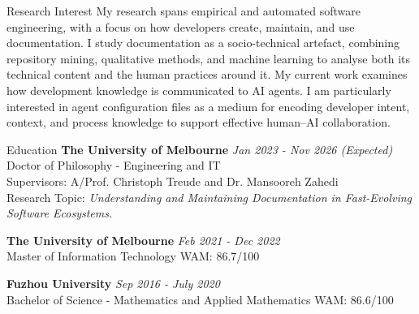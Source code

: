 \documentclass{resume}
\begin{document}

\begin{rSection}{Research Interest}
My research spans empirical and automated software engineering, with a focus on how developers create, maintain, and use documentation. I study documentation as a socio-technical artefact, combining repository mining, qualitative methods, and machine learning to analyse both its technical content and the human practices around it. My current work examines how development knowledge is communicated to AI agents. I am particularly interested in agent configuration files as a medium for encoding developer intent, context, and process knowledge to support effective human–AI collaboration.
    
\end{rSection}




\begin{rSection}{Education}
{\bf The University of Melbourne} \hfill {\em Jan 2023 - Nov 2026 (Expected)} 
\\ Doctor of Philosophy - Engineering and IT \hfill {}
\\ Supervisors: A/Prof. Christoph Treude and Dr. Mansooreh Zahedi\\
Research Topic: \textit{Understanding and Maintaining Documentation in Fast-Evolving Software Ecosystems.}

{\bf The University of Melbourne} \hfill {\em Feb 2021 - Dec 2022} 
\\ Master of Information Technology \hfill {WAM: 86.7/100} 

{\bf Fuzhou University} \hfill {\em Sep 2016 - July 2020} 
\\ Bachelor of Science - Mathematics and Applied Mathematics \hfill {WAM: 86.6/100} 



\end{rSection}
\end{document}
